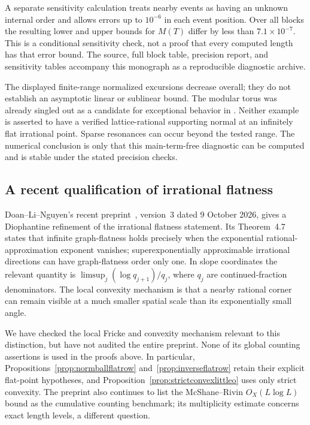A separate sensitivity calculation treats nearby events as having an
unknown internal order and allows errors up to $10^{-6}$ in each event
position. Over all blocks the resulting lower and upper bounds for
$M(T)$ differ by less than $7.1\times10^{-7}$. This is a conditional
sensitivity check, not a proof that every computed length has that error
bound. The source, full block table, precision report, and sensitivity
tables accompany this monograph as a reproducible diagnostic archive.

The displayed finite-range normalized excursions decrease overall;
they do not establish an asymptotic linear or sublinear bound. The modular
torus was already singled out as a candidate for exceptional behavior in
\cite[Conjecture~4.3]{McShaneRivinTori}. Neither example is asserted to
have a verified lattice-rational supporting normal at an infinitely flat
irrational point. Sparse resonances can occur beyond the tested range.
The numerical conclusion is only that this main-term-free diagnostic can
be computed and is stable under the stated precision checks.

\subsection{A recent qualification of irrational flatness}
\label{subsec:recentflatnessqualification}

Doan--Li--Nguyen's recent preprint~\cite{DoanLiNguyenStableNorm},
version~3 dated 9 October 2026, gives a Diophantine refinement of the
irrational flatness statement. Its Theorem~4.7 states that infinite
graph-flatness holds precisely when the exponential rational-approximation
exponent vanishes; superexponentially approximable irrational directions
can have graph-flatness order only one. In slope coordinates the relevant
quantity is $\limsup_j(\log q_{j+1})/q_j$, where $q_j$ are continued-fraction
denominators. The local convexity mechanism is that a nearby rational
corner can remain visible at a much smaller spatial scale than its
exponentially small angle.

We have checked the local Fricke and convexity mechanism relevant to
this distinction, but have not audited the entire preprint. None of its
global counting assertions is used in the proofs above. In particular,
Propositions~\ref{prop:normballflatrow} and~\ref{prop:inverseflatrow}
retain their explicit flat-point hypotheses, and
Proposition~\ref{prop:strictconvexlittleo} uses only strict convexity.
The preprint also continues to list the McShane--Rivin $O_X(L\log L)$
bound as the cumulative counting benchmark; its multiplicity estimate
concerns exact length levels, a different question.


